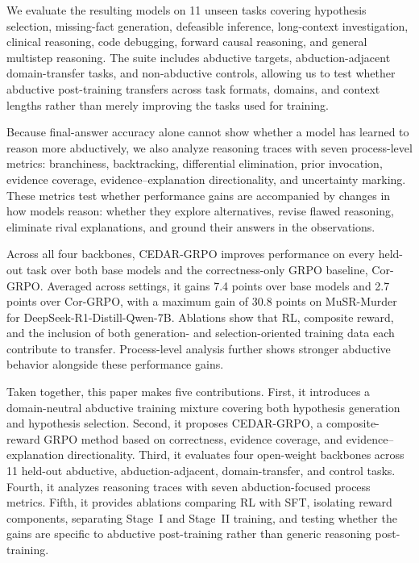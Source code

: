 \documentclass[11pt]{article}
\begin{document}
We evaluate the resulting models on 11 unseen tasks covering hypothesis selection, missing-fact generation, defeasible inference, long-context investigation, clinical reasoning, code debugging, forward causal reasoning, and general multistep reasoning. The suite includes abductive targets, abduction-adjacent domain-transfer tasks, and non-abductive controls, allowing us to test whether abductive post-training transfers across task formats, domains, and context lengths rather than merely improving the tasks used for training.

Because final-answer accuracy alone cannot show whether a model has learned to reason more abductively, we also analyze reasoning traces with seven process-level metrics: branchiness, backtracking, differential elimination, prior invocation, evidence coverage, evidence--explanation directionality, and uncertainty marking. These metrics test whether performance gains are accompanied by changes in how models reason: whether they explore alternatives, revise flawed reasoning, eliminate rival explanations, and ground their answers in the observations.

Across all four backbones, CEDAR-GRPO improves performance on every held-out task over both base models and the correctness-only GRPO baseline, Cor-GRPO. Averaged across settings, it gains 7.4 points over base models and 2.7 points over Cor-GRPO, with a maximum gain of 30.8 points on MuSR-Murder for DeepSeek-R1-Distill-Qwen-7B. Ablations show that RL, composite reward, and the inclusion of both generation- and selection-oriented training data each contribute to transfer. Process-level analysis further shows stronger abductive behavior alongside these performance gains.

Taken together, this paper makes five contributions. First, it introduces a domain-neutral abductive training mixture covering both hypothesis generation and hypothesis selection. Second, it proposes CEDAR-GRPO, a composite-reward GRPO method based on correctness, evidence coverage, and evidence--explanation directionality. Third, it evaluates four open-weight backbones across 11 held-out abductive, abduction-adjacent, domain-transfer, and control tasks. Fourth, it analyzes reasoning traces with seven abduction-focused process metrics. Fifth, it provides ablations comparing RL with SFT, isolating reward components, separating Stage~I and Stage~II training, and testing whether the gains are specific to abductive post-training rather than generic reasoning post-training.
\end{document}
